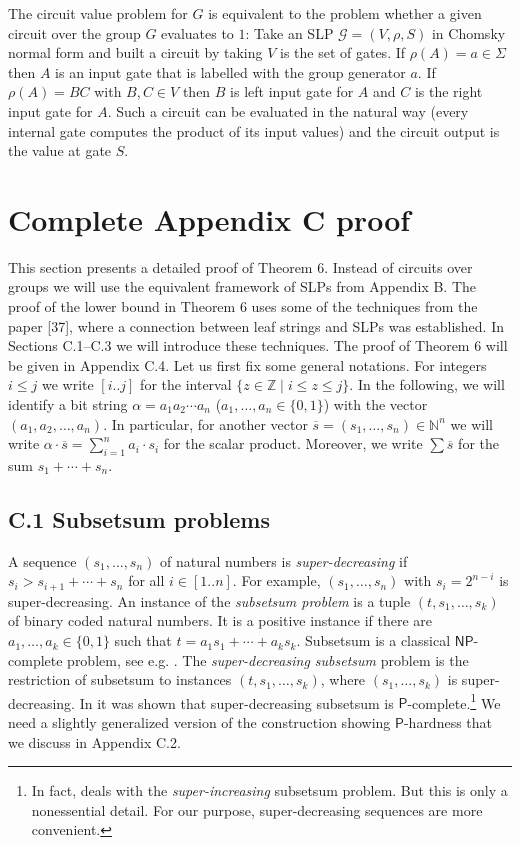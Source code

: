 \documentclass[10pt,a4paper]{article}
\newcommand{\ccinterval}[2]{[{#1}..{#2}]}
\newcommand{\NP}{\ensuremath{\mathsf{NP}}\xspace}
\newcommand{\Ptime}{\mathsf P}
\begin{document}
The circuit value problem for $G$ is equivalent to the problem whether a given circuit over the group $G$ evaluates to $1$: Take an SLP $\mathcal{G} = (V,\rho,S)$ in
Chomsky normal form and built a circuit by taking $V$ is the set of gates. If $\rho(A)=a  \in \Sigma$ then $A$ is an input gate that is labelled
with the group generator $a$. If $\rho(A) = BC$ with $B,C \in V$ then $B$ is left input gate for $A$ and $C$ is the right input gate for $A$.
Such a circuit can be evaluated in the natural way (every internal gate computes the product of its input values) and the circuit output is the value
at gate $S$. 



\section*{Complete Appendix C proof}\setcounter{equation}{2}
This section presents a detailed proof of Theorem 6. Instead of circuits over groups we will use the equivalent framework of SLPs from Appendix B. The proof of the lower bound in Theorem 6 uses some of the techniques from the paper [37], where a connection between leaf strings and SLPs was established. In Sections C.1--C.3 we will introduce these techniques. The proof of Theorem 6 will be given in Appendix C.4.
Let us first fix some general notations. For integers $i\le j$ we write $[i..j]$ for the interval $\{z\in\mathbb Z\mid i\le z\le j\}$. In the following, we will identify a bit string $\alpha=a_1a_2\cdots a_n$ ($a_1,\ldots,a_n\in\{0,1\}$) with the vector $(a_1,a_2,\ldots,a_n)$. In particular, for another vector $\overline{s}=(s_1,\ldots,s_n)\in\mathbb N^n$ we will write $\alpha\cdot\overline{s}=\sum_{i=1}^n a_i\cdot s_i$ for the scalar product. Moreover, we write $\sum\overline{s}$ for the sum $s_1+\cdots+s_n$.
\subsection*{C.1 Subsetsum problems}  \label{sec-subsetsum}

A sequence $(s_1,\ldots,s_n)$ of natural numbers is
\emph{super-decreasing} if $s_i > s_{i+1}+ \cdots + s_n$ for all $i \in \ccinterval{1}{n}$. For example, $(s_1,\ldots,s_n)$
with $s_i=2^{n-i}$ is super-decreasing.
An instance of the \emph{subsetsum problem} is 
a tuple $(t,s_1,\ldots,s_k)$ of binary coded natural numbers.
It is a positive instance if there are $a_1, \ldots, a_k \in \{0,1\}$ such that
$t = a_1 s_1 + \cdots + a_k s_k$. 
Subsetsum is a classical $\NP$-complete problem, see e.g. \cite{ref15}.
The \emph{super-decreasing subsetsum} problem is the restriction 
of subsetsum to instances $(t,s_1,\ldots,s_k)$, where $(s_1, \ldots, s_k)$
is super-decreasing. In \cite{ref30} it was shown that super-decreasing 
subsetsum is $\Ptime$-complete.\footnote{In fact, \cite{ref30} deals with
the {\em super-increasing} subsetsum problem. But this is only a nonessential
detail. For our purpose, super-decreasing sequences are more convenient.} 
We need a slightly generalized version of the construction showing $\Ptime$-hardness 
that we discuss in Appendix C.2.
\end{document}
